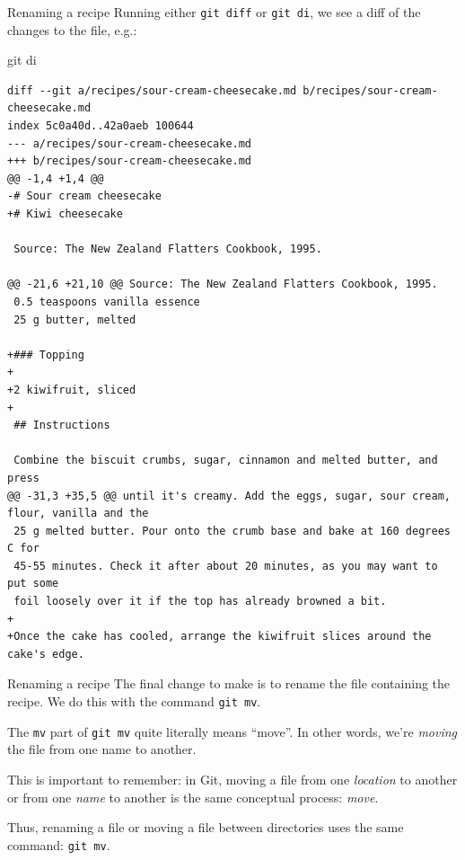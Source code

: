 \documentclass{git_course}
\begin{document}
\begin{frame}[fragile]{Renaming a recipe}
    Running either \texttt{git diff} or \texttt{git di},
    we see a diff of the changes to the file, e.g.:

    \begin{shellcode}
        git di
    \end{shellcode}
    \begin{verbatim}
diff --git a/recipes/sour-cream-cheesecake.md b/recipes/sour-cream-cheesecake.md
index 5c0a40d..42a0aeb 100644
--- a/recipes/sour-cream-cheesecake.md
+++ b/recipes/sour-cream-cheesecake.md
@@ -1,4 +1,4 @@
-# Sour cream cheesecake
+# Kiwi cheesecake

 Source: The New Zealand Flatters Cookbook, 1995.

@@ -21,6 +21,10 @@ Source: The New Zealand Flatters Cookbook, 1995.
 0.5 teaspoons vanilla essence
 25 g butter, melted

+### Topping
+
+2 kiwifruit, sliced
+
 ## Instructions

 Combine the biscuit crumbs, sugar, cinnamon and melted butter, and press
@@ -31,3 +35,5 @@ until it's creamy. Add the eggs, sugar, sour cream, flour, vanilla and the
 25 g melted butter. Pour onto the crumb base and bake at 160 degrees C for
 45-55 minutes. Check it after about 20 minutes, as you may want to put some
 foil loosely over it if the top has already browned a bit.
+
+Once the cake has cooled, arrange the kiwifruit slices around the cake's edge.
    \end{verbatim}
\end{frame}

\begin{frame}[fragile]{Renaming a recipe}
    The final change to make is to rename the file containing the recipe.
    We do this with the command \texttt{git mv}.

    The \texttt{mv} part of \texttt{git mv} quite
    literally means ``move''.  In other words, we're \emph{moving} the file
    from one name to another.

    This is important to remember: in Git, moving a file from one
    \emph{location} to another or from one \emph{name} to another is the
    same conceptual process: \emph{move}.

    Thus, renaming a file or moving a file between directories uses the same
    command: \texttt{git mv}.
\end{frame}
\end{document}
